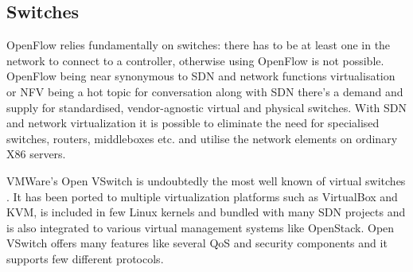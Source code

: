 \documentclass[english]{tktltiki2}
\theoremstyle{definition}
\theoremstyle{remark}
\begin{document}
\subsection{Switches}

OpenFlow relies fundamentally on switches: there has to be at least one in the network to connect to a controller, otherwise using OpenFlow is not possible. OpenFlow being near synonymous to SDN and network functions virtualisation or NFV being a hot topic for conversation along with SDN there’s a demand and supply for standardised, vendor-agnostic virtual and physical switches. With SDN and network virtualization it is possible to eliminate the need for specialised switches, routers, middleboxes etc. and utilise the network elements on ordinary X86 servers.

VMWare’s Open VSwitch is undoubtedly the most well known of virtual switches \cite{VSwitch}. It has been ported to multiple virtualization platforms such as VirtualBox
and KVM, is included in few Linux kernels and bundled with many SDN projects and is also integrated to various virtual management systems like OpenStack. Open VSwitch offers many features like several QoS and security components and it supports few different protocols.
\end{document}
